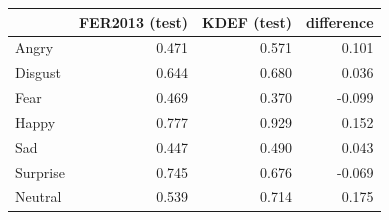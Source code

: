 \begin{tabular}{lrrr}
\toprule
 & FER2013 (test) & KDEF (test) & difference \\
\midrule
Angry & 0.471 & 0.571 & 0.101 \\
Disgust & 0.644 & 0.680 & 0.036 \\
Fear & 0.469 & 0.370 & -0.099 \\
Happy & 0.777 & 0.929 & 0.152 \\
Sad & 0.447 & 0.490 & 0.043 \\
Surprise & 0.745 & 0.676 & -0.069 \\
Neutral & 0.539 & 0.714 & 0.175 \\
\bottomrule
\end{tabular}

